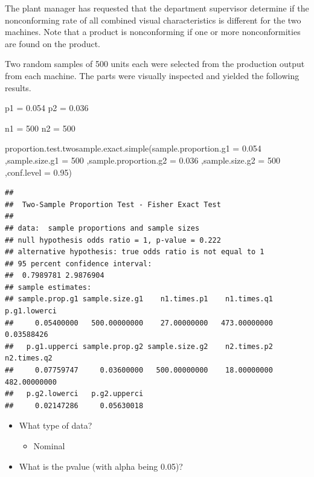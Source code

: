 \documentclass[
]{article}
\newenvironment{Shaded}{\begin{snugshade}}{\end{snugshade}}
\newcommand{\AttributeTok}[1]{\textcolor[rgb]{0.77,0.63,0.00}{#1}}
\newcommand{\DecValTok}[1]{\textcolor[rgb]{0.00,0.00,0.81}{#1}}
\newcommand{\FloatTok}[1]{\textcolor[rgb]{0.00,0.00,0.81}{#1}}
\newcommand{\FunctionTok}[1]{\textcolor[rgb]{0.00,0.00,0.00}{#1}}
\newcommand{\NormalTok}[1]{#1}
\providecommand{\tightlist}{%
  \setlength{\itemsep}{0pt}\setlength{\parskip}{0pt}}
\begin{document}
The plant manager has requested that the department supervisor determine
if the nonconforming rate of all combined visual characteristics is
different for the two machines. Note that a product is nonconforming if
one or more nonconformities are found on the product.

Two random samples of 500 units each were selected from the production
output from each machine. The parts were visually inspected and yielded
the following results.

p1 = 0.054 p2 = 0.036

n1 = 500 n2 = 500

\begin{Shaded}
\begin{Highlighting}[]
\FunctionTok{proportion.test.twosample.exact.simple}\NormalTok{(}\AttributeTok{sample.proportion.g1 =} \FloatTok{0.054}
\NormalTok{                                       ,}\AttributeTok{sample.size.g1 =} \DecValTok{500}
\NormalTok{                                       ,}\AttributeTok{sample.proportion.g2 =} \FloatTok{0.036}
\NormalTok{                                       ,}\AttributeTok{sample.size.g2 =} \DecValTok{500}
\NormalTok{                                       ,}\AttributeTok{conf.level =} \FloatTok{0.95}\NormalTok{)}
\end{Highlighting}
\end{Shaded}

\begin{verbatim}
## 
##  Two-Sample Proportion Test - Fisher Exact Test
## 
## data:  sample proportions and sample sizes
## null hypothesis odds ratio = 1, p-value = 0.222
## alternative hypothesis: true odds ratio is not equal to 1
## 95 percent confidence interval:
##  0.7989781 2.9876904
## sample estimates:
## sample.prop.g1 sample.size.g1    n1.times.p1    n1.times.q1   p.g1.lowerci 
##     0.05400000   500.00000000    27.00000000   473.00000000     0.03588426 
##   p.g1.upperci sample.prop.g2 sample.size.g2    n2.times.p2    n2.times.q2 
##     0.07759747     0.03600000   500.00000000    18.00000000   482.00000000 
##   p.g2.lowerci   p.g2.upperci 
##     0.02147286     0.05630018
\end{verbatim}

\begin{itemize}
\tightlist
\item
  What type of data?

  \begin{itemize}
  \tightlist
  \item
    Nominal
  \end{itemize}
\item
  What is the pvalue (with alpha being 0.05)?
\end{itemize}
\end{document}

